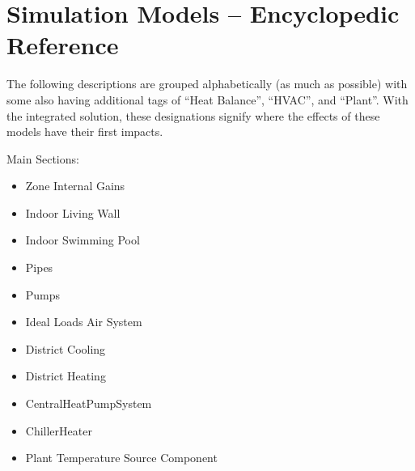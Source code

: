 \chapter{Simulation Models -- Encyclopedic Reference}\label{simulation-models---encyclopedic-reference-003}

The following descriptions are grouped alphabetically (as much as possible) with some also having additional tags of ``Heat Balance'', ``HVAC'', and ``Plant''. With the integrated solution, these designations signify where the effects of these models have their first impacts.

Main Sections:

\begin{itemize}
  \tightlist
  \item Zone Internal Gains
  \item Indoor Living Wall
  \item Indoor Swimming Pool
  \item Pipes
  \item Pumps
  \item Ideal Loads Air System
  \item District Cooling
  \item District Heating
  \item CentralHeatPumpSystem
  \item ChillerHeater
  \item Plant Temperature Source Component 
\end{itemize}
